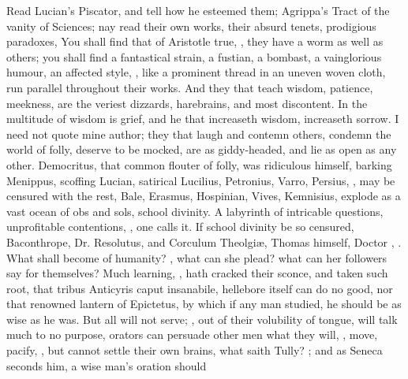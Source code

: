 {Read Lucian's Piscator, and tell how he esteemed them; Agrippa's Tract
of the vanity of Sciences; nay read their own works, their absurd
tenets, prodigious paradoxes,  You shall find
that of Aristotle true, ,
they have a worm as well as others; you shall find a fantastical
strain, a fustian, a bombast, a vainglorious humour, an affected style,
\etc{}, like a prominent thread in an uneven woven cloth, run parallel
throughout their works. And they that teach wisdom, patience, meekness,
are the veriest dizzards, harebrains, and most discontent. In the
multitude of wisdom is grief, and he that increaseth wisdom, increaseth
sorrow. I need not quote mine author; they that laugh and contemn
others, condemn the world of folly, deserve to be mocked, are as
giddy-headed, and lie as open as any other. Democritus, that
common flouter of folly, was ridiculous himself, barking Menippus,
scoffing Lucian, satirical Lucilius, Petronius, Varro, Persius, \etc{},
may be censured with the rest,  Bale, Erasmus, Hospinian, Vives, Kemnisius, explode as a vast
ocean of obs and sols, school divinity. A labyrinth of intricable
questions, unprofitable contentions, , one
calls it. If school divinity be so censured,  Baconthrope, Dr. Resolutus, and Corculum Theolgi\ae{},
Thomas himself, Doctor , \etc{}. What
shall become of humanity? , what can she plead? what can her
followers say for themselves? Much learning,  ,
hath cracked their sconce, and taken such root, that tribus Anticyris
caput insanabile, hellebore itself can do no good, nor that renowned
lantern of Epictetus, by which if any man studied, he should be as
wise as he was. But all will not serve; , out of their volubility of tongue, will
talk much to no purpose, orators can persuade other men what they will,
, move, pacify, \etc{}, but cannot settle their own
brains, what saith Tully? ; and as Seneca seconds him, a wise man's oration should
}
